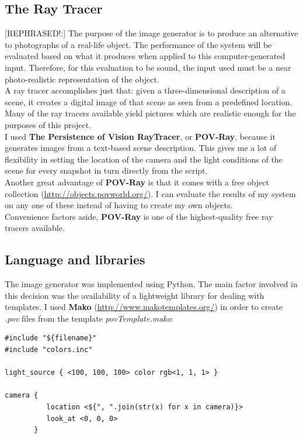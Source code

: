 \documentclass[12pt,a4paper,twoside,openright]{report}
\begin{document}
\subsection{The Ray Tracer} 
[REPHRASED!:] 
The purpose of the image generator is to produce an alternative to photographs of a real-life object. The performance of the system will be evaluated based on what it produces when applied to this computer-generated input. Therefore, for this evaluation to be sound, the input used must be a near photo-realistic representation of the object.\\  
\linebreak
A ray tracer accomplishes just that: given a three-dimensional description of a scene, it creates a digital image of that scene as seen from a predefined location. Many of the ray tracers available yield pictures which are realistic enough for the purposes of this project. \\   
I used \textbf{The Persistence of Vision RayTracer}, or \textbf{POV-Ray}, because it generates images from a text-based scene description. This gives me a lot of flexibility in setting the location of the camera and the light conditions of the scene for every snapshot in turn directly from the script. \\
Another great advantage of \textbf{POV-Ray} is that it comes with a free object collection (\url{http://objects.povworld.org/}). I can evaluate the results of my system on any one of these instead of having to create my own objects.\\
Convenience factors aside, \textbf{POV-Ray} is one of the highest-quality free ray tracers available.

\subsection{Language and libraries}
The image generator was implemented using Python. The main factor involved in this decision was the availability of a lightweight library for dealing with templates. I used \textbf{Mako} (\url{http://www.makotemplates.org/}) in order to create \textit{.pov} files from the template \textit{povTemplate.mako}: 

\begin{verbatim}
#include "${filename}"
#include "colors.inc"

light_source { <100, 100, 100> color rgb<1, 1, 1> }

camera {
          location <${", ".join(str(x) for x in camera)}>
          look_at <0, 0, 0>
       }
\end{verbatim} \\
\end{document}
